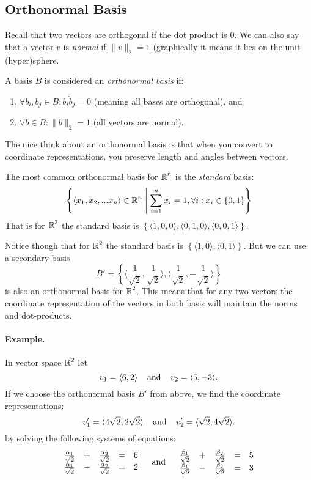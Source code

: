 \subsection{Orthonormal Basis}
Recall that two vectors are orthogonal if the dot product is 0. 
We can also say that a vector $v$ is \emph{normal} if $\|v\|_2=1$ (graphically it means it lies on the unit (hyper)sphere. 

A basis $B$ is considered an \emph{orthonormal basis} if:
\begin{enumerate}
\item $\forall b_i, b_j\in B: b_i \dot b_j = 0$ (meaning all bases are orthogonal), and 
\item $\forall b \in B : \|b\|_2=1$ (all vectors are normal). 
\end{enumerate}

The nice think about an orthonormal basis is that when you convert to coordinate representations, you preserve length and angles between vectors. 

The most common orthonormal basis for $\operatorname{\mathbb{R}}^n$ is the \emph{standard} basis: 
\[\left\{\left\langle x_1, x_2, ... x_n\right\rangle \in \operatorname{\mathbb{R}}^n \;\middle|\; \sum_{i=1}^n x_i = 1, \forall i : x_i \in \left\{0,1\right\}\right\}\]
That is for $\operatorname{\mathbb{R}}^3$ the standard basis is $\left\{\langle1,0,0\rangle,\langle0,1,0\rangle,\langle0,0,1\rangle\right\}$.

Notice though that for $\operatorname{\mathbb{R}}^2$ the standard basis is $\left\{\langle1,0\rangle,\langle0,1\rangle\right\}$.
But we can use a secondary basis \[B'=\left\{\langle\frac{1}{\sqrt{2}},\frac{1}{\sqrt{2}}\rangle,\langle\frac{1}{\sqrt{2}},-\frac{1}{\sqrt{2}}\rangle\right\}\] is also an orthonormal basis for $\operatorname{\mathbb{R}}^2$. 
This means that for any two vectors the coordinate representation of the vectors in both basis will maintain the norms and dot-products. 

\paragraph{Example.}
In vector space $\operatorname{\mathbb{R}}^2$ let \[v_1 = \langle6,2\rangle\;\;\;\;\textnormal{and}\;\;\;\; v_2 = \langle5,-3\rangle.\]
If we choose the orthonormal basis  $B'$ from above, 
we find the coordinate representations:
\[
v'_1 = \langle4\sqrt{2},2\sqrt{2}\rangle \;\;\;\;\textnormal{and}\;\;\;\; v'_2 = \langle\sqrt{2},4\sqrt{2}\rangle.
\]
by solving the following systems of equations: 
\[
\begin{array}{rcrcr}
\frac{\alpha_1}{\sqrt{2}} &+& \frac{\alpha_2}{\sqrt{2}} &=& 6\\
\frac{\alpha_1}{\sqrt{2}} &-& \frac{\alpha_2}{\sqrt{2}} &=& 2\\ 
\end{array} \;\;\;\;\textnormal{and}\;\;\;\; \begin{array}{rcrcr}
\frac{\beta_1}{\sqrt{2}} &+& \frac{\beta_2}{\sqrt{2}} &=& 5\\
\frac{\beta_1}{\sqrt{2}} &-& \frac{\beta_2}{\sqrt{2}} &=& 3\\ 
\end{array}\]

